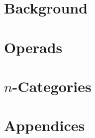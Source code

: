 \documentclass[12pt,oneside,makeidx]{book}
\begin{document}

\tableofcontents


\frontmatter







\mainmatter

\part{Background}	
\label{part:background}

	



\part{Operads}
\label{part:operads}






\part{$n$-Categories}
\label{part:n-categories}






\part*{Appendices}

\appendix











\backmatter




\small
{}
\printindex
\end{document}
